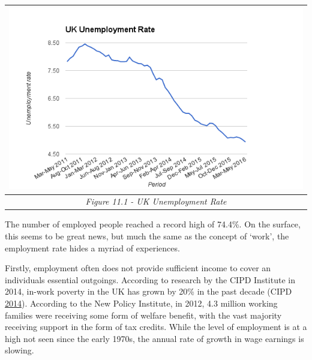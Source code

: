 \documentclass[]{tufte-handout}
\begin{document}
\begin{longtable}[]{@{}c@{}}
\toprule
\includegraphics{ChapterPictures/11-1-UKUnemploymentRate.png}\tabularnewline
\midrule
\endhead
\emph{Figure 11.1 - UK Unemployment Rate}\tabularnewline
\bottomrule
\end{longtable}

The number of employed people reached a record high of 74.4\%. On the
surface, this seems to be great news, but much the same as the concept
of `work', the employment rate hides a myriad of experiences.

Firstly, employment often does not provide sufficient income to cover an
individuals essential outgoings. According to research by the CIPD
Institute in 2014, in-work poverty in the UK has grown by 20\% in the
past decade (CIPD \protect\hyperlink{ref-CIPD2014}{2014}). According to
the New Policy Institute, in 2012, 4.3 million working families were
receiving some form of welfare benefit, with the vast majority receiving
support in the form of tax credits. While the level of employment is at
a high not seen since the early 1970s, the annual rate of growth in wage
earnings is slowing.
\end{document}
